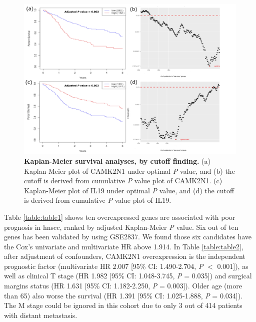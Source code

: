 \documentclass[12pt, a4paper]{article}
\newcommand{\bcaption}[2]{\caption{\textbf{#1} #2}}
\begin{document}
\begin{figure}[hp]
\centering
\includegraphics[width=15cm]{Figure_4_CAMK2N1_IL19.pdf}
\bcaption{Kaplan-Meier survival analyses, by cutoff finding.}
{(a) Kaplan-Meier plot of CAMK2N1 under optimal \textit{P} value, and (b) the cutoff is derived from cumulative \textit{P} value plot of CAMK2N1. (c) Kaplan-Meier plot of IL19 under optimal \textit{P} value, and (d) the cutoff is derived from cumulative \textit{P} value plot of IL19.}
\label{fig:figure4}
\end{figure}

\clearpage

Table \ref{table:table1} shows ten overexpressed genes are associated with poor prognosis in \acrshort{hnscc}, ranked by adjusted Kaplan-Meier \textit{P} value.
Six out of ten genes has been validated by using GSE2837.
We found those six candidates have the Cox's univariate and multivariate HR above 1.914.
In Table \ref{table:table2}, %
after adjustment of confounders, \acrshort{CAMK2N1} overexpression is the independent prognostic factor (multivariate HR 2.007 [95\% CI: 1.490-2.704, \textit{P} $<$ 0.001]), as well as clinical T stage (HR 1.982 [95\% CI: 1.048-3.745, \textit{P} = 0.035]) and surgical margins status (HR 1.631 [95\% CI: 1.182-2.250, \textit{P} = 0.003]). 
Older age (more than 65) also worse the survival (HR 1.391 [95\% CI: 1.025-1.888, \textit{P} = 0.034]). 
The M stage could be ignored in this cohort due to only 3 out of 414 patients with distant metastasis.
\end{document}
